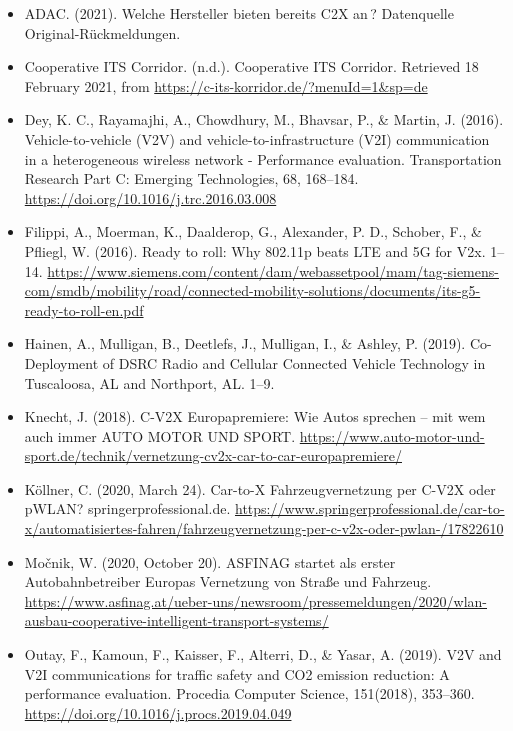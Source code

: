 \documentclass[
]{book}
\providecommand{\tightlist}{%
  \setlength{\itemsep}{0pt}\setlength{\parskip}{0pt}}
\begin{document}
\begin{itemize}
\tightlist
\item
  ADAC. (2021). Welche Hersteller bieten bereits C2X an\,? Datenquelle Original-Rückmeldungen.
\item
  Cooperative ITS Corridor. (n.d.). Cooperative ITS Corridor. Retrieved 18 February 2021, from \url{https://c-its-korridor.de/?menuId=1\&sp=de}
\item
  Dey, K. C., Rayamajhi, A., Chowdhury, M., Bhavsar, P., \& Martin, J. (2016). Vehicle-to-vehicle (V2V) and vehicle-to-infrastructure (V2I) communication in a heterogeneous wireless network - Performance evaluation. Transportation Research Part C: Emerging Technologies, 68, 168--184. \url{https://doi.org/10.1016/j.trc.2016.03.008}
\item
  Filippi, A., Moerman, K., Daalderop, G., Alexander, P. D., Schober, F., \& Pfliegl, W. (2016). Ready to roll: Why 802.11p beats LTE and 5G for V2x. 1--14. \url{https://www.siemens.com/content/dam/webassetpool/mam/tag-siemens-com/smdb/mobility/road/connected-mobility-solutions/documents/its-g5-ready-to-roll-en.pdf}
\item
  Hainen, A., Mulligan, B., Deetlefs, J., Mulligan, I., \& Ashley, P. (2019). Co-Deployment of DSRC Radio and Cellular Connected Vehicle Technology in Tuscaloosa, AL and Northport, AL. 1--9.
\item
  Knecht, J. (2018). C-V2X Europapremiere: Wie Autos sprechen -- mit wem auch immer \textbar{} AUTO MOTOR UND SPORT. \url{https://www.auto-motor-und-sport.de/technik/vernetzung-cv2x-car-to-car-europapremiere/}
\item
  Köllner, C. (2020, March 24). Car-to-X \textbar{} Fahrzeugvernetzung per C-V2X oder pWLAN? \textbar{} springerprofessional.de. \url{https://www.springerprofessional.de/car-to-x/automatisiertes-fahren/fahrzeugvernetzung-per-c-v2x-oder-pwlan-/17822610}
\item
  Močnik, W. (2020, October 20). ASFINAG startet als erster Autobahnbetreiber Europas Vernetzung von Straße und Fahrzeug. \url{https://www.asfinag.at/ueber-uns/newsroom/pressemeldungen/2020/wlan-ausbau-cooperative-intelligent-transport-systems/}
\item
  Outay, F., Kamoun, F., Kaisser, F., Alterri, D., \& Yasar, A. (2019). V2V and V2I communications for traffic safety and CO2 emission reduction: A performance evaluation. Procedia Computer Science, 151(2018), 353--360. \url{https://doi.org/10.1016/j.procs.2019.04.049}
\end{itemize}
\end{document}
